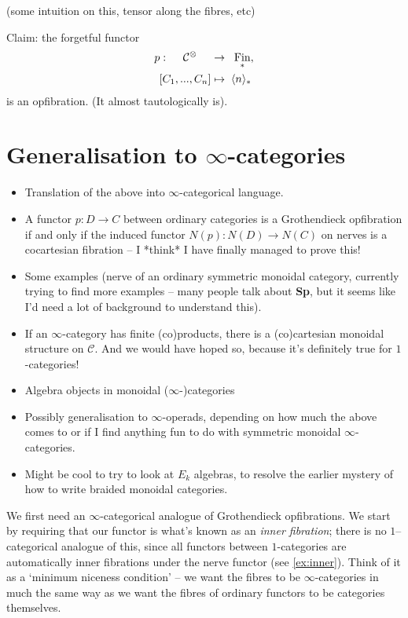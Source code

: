 \documentclass{MetricNotes2023}
\DeclareMathOperator{\Fin}{Fin}
\begin{document}
(some intuition on this, tensor along the fibres, etc)

Claim: the forgetful functor
\begin{align*}
p : \quad\;\mathcal{C}^\otimes \quad\;&\to \;\;\Fin_*,\\
[C_1, ..., C_n] &\mapsto \;\ang{n}_*
\end{align*}
is an opfibration. (It almost tautologically is). 

\section{Generalisation to \(\infty\)-categories}

\begin{itemize}
\item Translation of the above into \(\infty\)-categorical language.
\item A functor \(p : D \to C\) between ordinary categories is a Grothendieck opfibration if and only if the induced functor \(N(p) : N(D) \to N(C)\) on nerves is a cocartesian fibration -- I *think* I have finally managed to prove this!
\item Some examples (nerve of an ordinary symmetric monoidal category, currently trying to find more examples -- many people talk about \textbf{Sp}, but it seems like I'd need a lot of background to understand this).
\item If an \(\infty\)-category has finite (co)products, there is a (co)cartesian monoidal structure on \(\mathcal{C}\). And we would have hoped so, because it's definitely true for \(1\)-categories!
\item Algebra objects in monoidal (\(\infty\)-)categories
\item Possibly generalisation to \(\infty\)-operads, depending on how much the above comes to or if I find anything fun to do with symmetric monoidal \(\infty\)-categories. 
\item Might be cool to try to look at \(E_k\) algebras, to resolve the earlier mystery of how to write braided monoidal categories.
\end{itemize}

We first need an \(\infty\)-categorical analogue of Grothendieck opfibrations. We start by requiring that our functor is what's known as an \textit{inner fibration}; there is no \(1\)--categorical analogue of this, since all functors between \(1\)-categories are automatically inner fibrations under the nerve functor (see \ref{ex:inner}). Think of it as a `minimum niceness condition' -- we want the fibres to be \(\infty\)-categories in much the same way as we want the fibres of ordinary functors to be categories themselves. 
\end{document}
